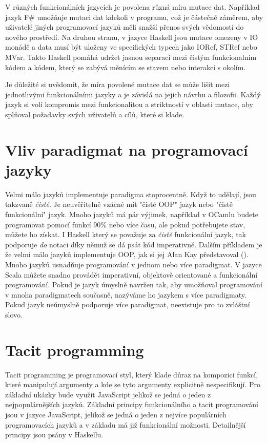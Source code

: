 \documentclass[male,czech]{kithesis}
\begin{document}
V různých funkcionálních jazycích je povolena různá míra mutace dat.
Například jazyk F\# umožňuje mutaci dat kdekoli v programu, 
což je částečně záměrem, 
aby uživatelé jiných programovací jazyků měli snažší přenos svých vědomostí do 
nového prostředí.
Na druhou stranu, 
v jazyce Haskell jsou mutace omezeny v IO monádě a 
data musí být uloženy 
ve specifických typech jako IORef, STRef nebo MVar. 
Takto Haskell pomáhá udržet jasnou separaci mezi čistým funkcionalním kódem a kódem, 
který se zabývá měnícím se stavem nebo interakcí s okolím.

Je důležité si uvědomit, 
že míra povolené mutace dat se může lišit mezi jednotlivými funkcionálními jazyky a 
je závislá na jejich návrhu a filozofii. 
Každý jazyk si volí kompromis mezi funkcionalitou a 
striktností v oblasti mutace, 
aby splňoval požadavky svých uživatelů a cílů, 
které si klade.

\section{Vliv paradigmat na programovací jazyky}
Velmi málo jazyků implementuje paradigma stoprocentně. 
Když to udělají, 
jsou takzvaně \textit{čisté}. 
Je neuvěřitelně vzácné mít "čistě OOP" jazyk nebo 
"čistě funkcionální" jazyk. 
Mnoho jazyků má pár výjimek, například v OCamlu budete programovat pomocí funkcí 90\% nebo 
více času, ale pokud potřebujete stav, můžete ho získat. 
I Haskell který se považuje za \textit{čistě} funkcionální jazyk,
tak podporuje \textit{do} notaci díky němuž se dá psát kód imperativně.
Dalším příkladem je že velmi málo jazyků implementuje OOP, 
jak si jej Alan Kay představoval (\cite{ProgrammingParadigms}).
Mnoho jazyků usnadňuje programování v jednom nebo více paradigmat. 
V jazyce Scala můžete snadno provádět imperativní, 
objektově orientované a funkcionální programování. 
Pokud je jazyk úmyslně navržen tak, 
aby umožňoval programování v mnoha paradigmatech současně, 
nazýváme ho jazykem s více paradigmaty. 
Pokud jazyk neúmyslně podporuje více paradigmat, 
neexistuje pro to zvláštní slovo.

\section{Tacit programming}

Tacit programming je programovací styl, 
který klade důraz na kompozici funkcí, 
které manipulují argumenty a 
kde se tyto argumenty explicitně nespecifikují.
Pro základní ukázky bude využit JavaScript jelikož se jedná o jeden z nejpopulárnějších jazyků. 
Základní principy funkcionálního a tacit programování jsou v jazyce JavaScript,
jelikož se jedná o jeden z nejvíce populárních programovacích jazyků a v základu má již funkcionální možnosti.
Detailnější principy jsou psány v Haskellu.
\end{document}
